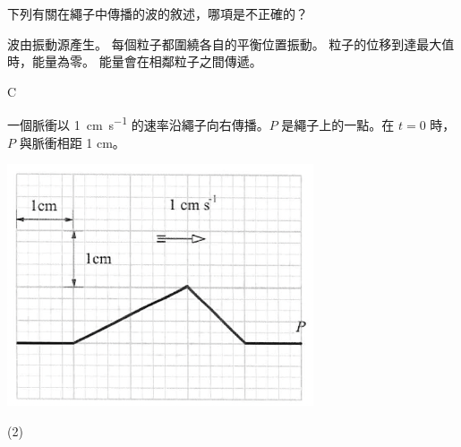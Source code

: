 {
    下列有關在繩子中傳播的波的敘述，哪項是不正確的？
    \begin{tasks}
        \task 波由振動源產生。
        \task 每個粒子都圍繞各自的平衡位置振動。
        \task 粒子的位移到達最大值時，能量為零。
        \task 能量會在相鄰粒子之間傳遞。
    \end{tasks}

}{
    \mckey C
}

{
    一個脈衝以 \qty{1}{cm.s^{-1}} 的速率沿繩子向右傳播。$P$ 是繩子上的一點。在 $t=0$ 時，$P$ 與脈衝相距 1 cm。
    \par{\par\centering\includegraphics[width=.35\textwidth]{./img/ch1_earlyclass_wave_mc_2024-05-13-20-31-17.png}\par}
    \begin{tasks}(2)
        \task {}
        \task {}
        \task {}

\end{tasks}}
